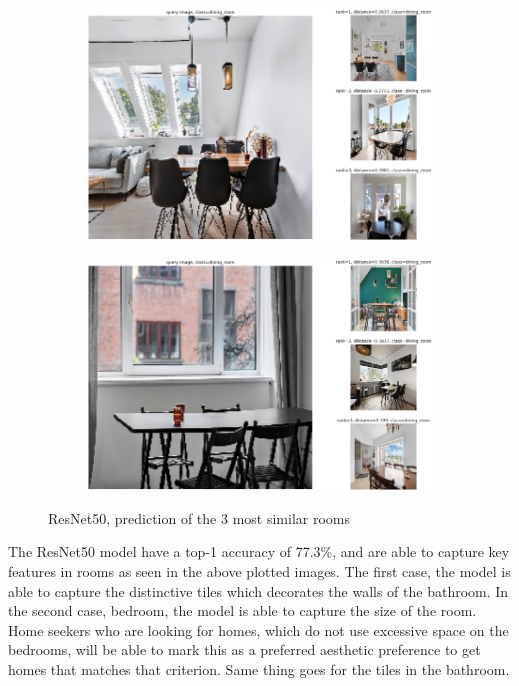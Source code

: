 \begin{figure}[H]
\begin{subfigure}[b]{0.45\textwidth}
      \label{fig:2}
    \end{subfigure}
    \hfill
    \begin{subfigure}[b]{0.45\textwidth}
      \centering
      \includegraphics[width=\textwidth]{pictures/random/resnet50diningplot}
      \label{fig:3}
    \end{subfigure}
    \hfill
    \begin{subfigure}[b]{0.45\textwidth}
      \centering
      \includegraphics[width=\textwidth]{pictures/random/resnet50diningplot1}
      \label{fig:4}
    \end{subfigure}
    \caption{ResNet50, prediction of the 3 most similar rooms}
    \label{fig:misfoster}
\end{figure}
The ResNet50 model have a top-1 accuracy of 77.3\%, and are able to capture key features in rooms as seen in the above plotted images. The first case, the model is able to capture the distinctive tiles which decorates the walls of the bathroom. In the second case, bedroom, the model is able to capture the size of the room. Home seekers who are looking for homes, which do not use excessive space on the bedrooms, will be able to mark this as a preferred aesthetic preference to get homes that matches that criterion. Same thing goes for the tiles in the bathroom.
